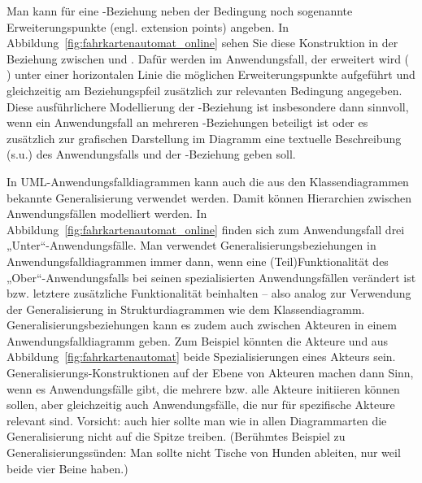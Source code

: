 \vspace{1mm} %

Man  kann für eine -Beziehung neben der Bedingung noch sogenannte Erweiterungspunkte (engl. extension points) angeben. In Abbildung~\ref{fig:fahrkartenautomat_online} sehen Sie diese Konstruktion in der Beziehung zwischen   und  . Dafür werden im Anwendungsfall, der erweitert wird ( ) unter einer horizontalen Linie die möglichen Erweiterungspunkte aufgeführt und gleichzeitig am Beziehungspfeil zusätzlich zur relevanten Bedingung angegeben. Diese 
\linebreak %
ausführlichere Modellierung der -Beziehung ist insbesondere dann sinnvoll, wenn ein Anwendungs\-fall an mehreren -Beziehungen beteiligt ist oder es zusätzlich zur grafischen Darstellung im Diagramm eine textuelle Beschreibung (s.u.) des Anwendungs\-falls und der -Beziehung geben soll.

In UML-Anwendungsfalldiagrammen kann auch die aus den Klassendiagrammen bekannte Generalisierung verwendet werden. Damit können Hierarchien zwischen 
\linebreak %
Anwendungsfällen modelliert werden. In Abbildung~\ref{fig:fahrkartenautomat_online} finden sich zum Anwendungsfall  drei „Unter“-Anwendungsfälle. Man verwendet
\linebreak %
Generalisierungsbeziehungen in Anwendungsfalldiagrammen immer dann, wenn eine (Teil)Funktionalität des „Ober“-Anwendungsfalls bei seinen spezialisierten Anwendungsfällen verändert ist bzw. letztere zusätzliche Funktionalität beinhalten -- also analog zur Verwendung der Generalisierung in Strukturdiagrammen wie dem Klassen\-diagramm. Generalisierungsbeziehungen kann es zudem auch zwischen Akteuren in einem Anwendungsfalldiagramm geben. Zum Beispiel könnten die Akteure  und  aus Abbildung~\ref{fig:fahrkartenautomat} beide Spezialisierungen eines Akteurs  sein. Gene\-rali\-sierungs-Kon\-struk\-tionen auf der Ebene von Akteuren machen dann Sinn, wenn es Anwendungsfälle gibt, die mehrere bzw. alle Akteure initi\-ieren können sollen, aber gleichzeitig auch Anwendungsfälle, die nur für spezifische Akteure relevant sind. Vorsicht: auch hier sollte man wie in allen Diagrammarten die Generalisierung nicht auf die Spitze treiben. (Berühmtes Beispiel zu Generalisierungssünden: Man sollte nicht Tische von Hunden ableiten, nur weil beide vier Beine haben.)

